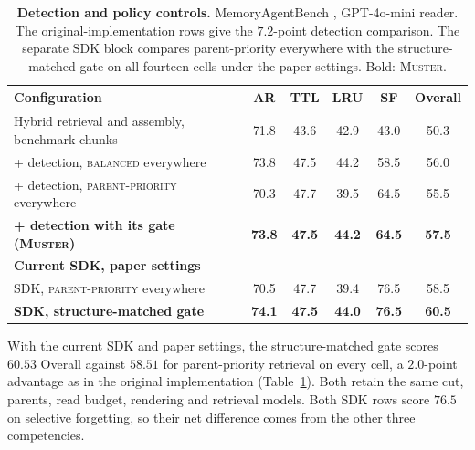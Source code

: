 \documentclass{article}
\newcommand{\ours}{\rowcolor{oursbg}}
\newcommand{\tabfont}{\fontsize{7.5}{8.5}\selectfont\renewcommand{\arraystretch}{1.0}}
\newcommand{\sys}{\textsc{Muster}}
\newcommand{\balanced}{\textsc{balanced}}
\newcommand{\parprio}{\textsc{parent-priority}}
\begin{document}
\begin{table}[t]
\centering\tabfont
\caption{\textbf{Detection and policy controls.} MemoryAgentBench \cite{mab}, GPT-4o-mini \cite{gpt4omini} reader. The original-implementation rows give the $7.2$-point detection comparison. The separate SDK block compares parent-priority everywhere with the structure-matched gate on all fourteen cells under the paper settings. Bold: \sys{}.}
\label{tab:gate}
\setlength{\tabcolsep}{3pt}\setlength{\aboverulesep}{0pt}\setlength{\belowrulesep}{0pt}\setlength{\extrarowheight}{0.8pt}
\begin{tabular}{l*{5}{c}}
\toprule
Configuration & AR & TTL & LRU & SF & Overall \\
\midrule
Hybrid retrieval and assembly, benchmark chunks & 71.8 & 43.6 & 42.9 & 43.0 & 50.3 \\
\midrule
+ detection, \balanced{} everywhere & 73.8 & 47.5 & 44.2 & 58.5 & 56.0 \\
+ detection, \parprio{} everywhere & 70.3 & 47.7 & 39.5 & 64.5 & 55.5 \\
\midrule
\ours \textbf{+ detection with its gate (\sys{})} & \textbf{73.8} & \textbf{47.5} & \textbf{44.2} & \textbf{64.5} & \textbf{57.5} \\
\midrule[\heavyrulewidth]
\multicolumn{6}{l}{\textbf{Current SDK, paper settings}}\\
SDK, \parprio{} everywhere & 70.5 & 47.7 & 39.4 & 76.5 & 58.5 \\
\ours \textbf{SDK, structure-matched gate} & \textbf{74.1} & \textbf{47.5} & \textbf{44.0} & \textbf{76.5} & \textbf{60.5} \\
\bottomrule
\end{tabular}
\end{table}

With the current SDK and paper settings, the structure-matched gate scores $60.53$ Overall against $58.51$ for parent-priority retrieval on every cell, a $2.0$-point advantage as in the original implementation (Table~\ref{tab:gate}). Both retain the same cut, parents, read budget, rendering and retrieval models. Both SDK rows score $76.5$ on selective forgetting, so their net difference comes from the other three competencies.
\end{document}
